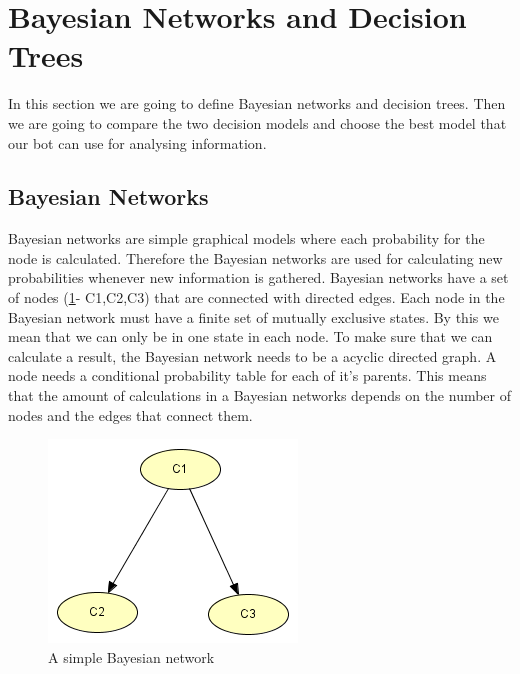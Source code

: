 \section{Bayesian Networks and Decision Trees}
In this section we are going to define Bayesian networks and decision trees. Then we are going to compare the two decision models and choose the best model that our bot can use for analysing information.

\subsection{Bayesian Networks}
	Bayesian networks are simple graphical models where each probability for the node is calculated. Therefore the Bayesian networks are used for calculating new probabilities whenever new information is gathered. Bayesian networks have a  set of nodes (\ref{fig:basicbayesian}- C1,C2,C3) that are connected with directed edges. Each node in the Bayesian network must have a finite set of mutually exclusive states. By this we mean that we can only be in one state in each node. To make sure that we can calculate a result, the Bayesian network needs to be a acyclic directed graph. A node needs a conditional probability table for each of it's parents. This means that the amount of calculations in a Bayesian networks depends on the number of nodes and the edges that connect them. \cite[p. 33]{Bayesian_Network_Design}
	
\begin{figure}[H]
\includegraphics{Figures/BayesianPictures/BasicBayesianNetwork.png}
\caption{A simple Bayesian network}
\label{fig:basicbayesian}
\end{figure}


